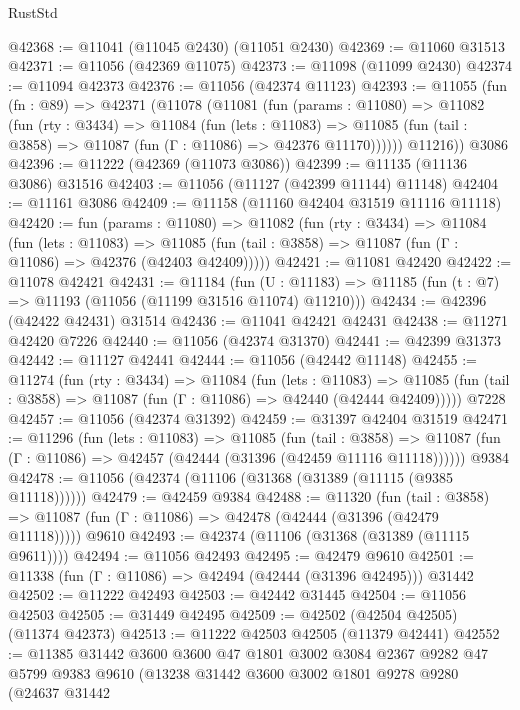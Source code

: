 \begin{lexlean}{RustStd}
\begin{coremodule}
@42368 := @11041 (@11045 @2430) (@11051 @2430)
@42369 := @11060 @31513
@42371 := @11056 (@42369 @11075)
@42373 := @11098 (@11099 @2430)
@42374 := @11094 @42373
@42376 := @11056 (@42374 @11123)
@42393 := @11055
    (fun (fn : @89) =>
    @42371
      (@11078
        (@11081
          (fun (params : @11080) =>
          @11082
            (fun (rty : @3434) =>
            @11084
              (fun (lets : @11083) =>
              @11085 (fun (tail : @3858) => @11087 (fun (Γ : @11086) => @42376 @11170))))))
        @11216))
    @3086
@42396 := @11222 (@42369 (@11073 @3086))
@42399 := @11135 (@11136 @3086) @31516
@42403 := @11056 (@11127 (@42399 @11144) @11148)
@42404 := @11161 @3086
@42409 := @11158 (@11160 @42404 @31519 @11116 @11118)
@42420 := fun (params : @11080) =>
  @11082
    (fun (rty : @3434) =>
    @11084
      (fun (lets : @11083) =>
      @11085 (fun (tail : @3858) => @11087 (fun (Γ : @11086) => @42376 (@42403 @42409)))))
@42421 := @11081 @42420
@42422 := @11078 @42421
@42431 := @11184
    (fun (U : @11183) => @11185 (fun (t : @7) => @11193 (@11056 (@11199 @31516 @11074) @11210)))
@42434 := @42396 (@42422 @42431) @31514
@42436 := @11041 @42421 @42431
@42438 := @11271 @42420 @7226
@42440 := @11056 (@42374 @31370)
@42441 := @42399 @31373
@42442 := @11127 @42441
@42444 := @11056 (@42442 @11148)
@42455 := @11274
    (fun (rty : @3434) =>
    @11084
      (fun (lets : @11083) =>
      @11085 (fun (tail : @3858) => @11087 (fun (Γ : @11086) => @42440 (@42444 @42409)))))
    @7228
@42457 := @11056 (@42374 @31392)
@42459 := @31397 @42404 @31519
@42471 := @11296
    (fun (lets : @11083) =>
    @11085
      (fun (tail : @3858) =>
      @11087 (fun (Γ : @11086) => @42457 (@42444 (@31396 (@42459 @11116 @11118))))))
    @9384
@42478 := @11056 (@42374 (@11106 (@31368 (@31389 (@11115 (@9385 @11118))))))
@42479 := @42459 @9384
@42488 := @11320
    (fun (tail : @3858) => @11087 (fun (Γ : @11086) => @42478 (@42444 (@31396 (@42479 @11118)))))
    @9610
@42493 := @42374 (@11106 (@31368 (@31389 (@11115 @9611))))
@42494 := @11056 @42493
@42495 := @42479 @9610
@42501 := @11338 (fun (Γ : @11086) => @42494 (@42444 (@31396 @42495))) @31442
@42502 := @11222 @42493
@42503 := @42442 @31445
@42504 := @11056 @42503
@42505 := @31449 @42495
@42509 := @42502 (@42504 @42505) (@11374 @42373)
@42513 := @11222 @42503 @42505 (@11379 @42441)
@42552 := @11385
    @31442
    @3600
    @3600
    @47
    @1801
    @3002
    @3084
    @2367
    @9282
    @47
    @5799
    @9383
    @9610
    (@13238
      @31442
      @3600
      @3002
      @1801
      @9278
      @9280
      (@24637
        @31442

\end{coremodule}
\end{lexlean}
